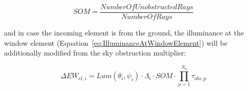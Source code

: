 \begin{equation}
SOM = \frac{{NumberOfUnobstructedRays}}{{NumberOfRays}}
\end{equation}

and in case the incoming element is from the ground, the illuminance at the window element (Equation~\ref{eq:IlluminanceAtWindowElement}) will be additionally modified from the sky obstruction multiplier:

\begin{equation}
\Delta E{W_{el,i}} = Lum({\theta_i},{\psi_i}) \cdot {\Lambda_i} \cdot SOM \cdot \prod\limits_{p = 1}^{{N_o}} {{\tau_{obs,p}}}
\end{equation}

